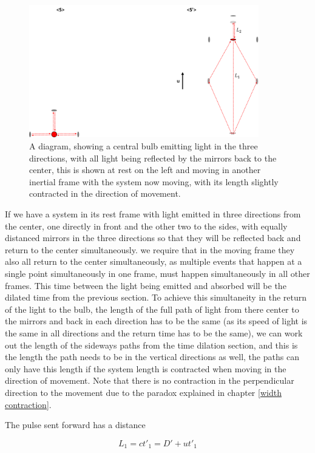 \begin{figure}[H]
	\centering
	\includegraphics[width=10cm]{images/pdf/Length_Contraction.pdf}
	\caption{A diagram, showing a central bulb emitting light in the three directions, with all light being reflected by the mirrors back to the center, this is shown at rest on the left and moving in another inertial frame with the system now moving, with its length slightly contracted in the direction of movement.}
	\label{fig: length contraction math}
\end{figure}

If we have a system in its rest frame with light emitted in three directions from the center, one directly in front and the other two to the sides, with equally distanced mirrors in the three directions so that they will be reflected back and return to the center simultaneously. we require that in the moving frame they also all return to the center simultaneously, as multiple events that happen at a single point simultaneously in one frame, must happen simultaneously in all other frames. This time between the light being emitted and absorbed will be the dilated time from the previous section. To achieve this simultaneity in the return of the light to the bulb, the length of the full path of light from there center to the mirrors and back in each direction has to be the same (as its speed of light is the same in all directions and the return time has to be the same), we can work out the length of the sideways paths from the time dilation section, and this is the length the path needs to be in the vertical directions as well, the paths can only have this length if the system length is contracted when moving in the direction of movement. Note that there is no contraction in the perpendicular direction to the movement due to the paradox explained in chapter \ref{width contraction}.

The pulse sent forward has a distance

\begin{equation}
	L_1= ct'_1= D' + ut'_1
\end{equation}

